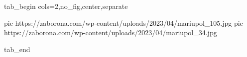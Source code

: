  
 
 
 
 


\ifcmt
  tab_begin cols=2,no_fig,center,separate

     pic https://zaborona.com/wp-content/uploads/2023/04/mariupol_105.jpg
		 pic https://zaborona.com/wp-content/uploads/2023/04/mariupol_34.jpg

  tab_end
\fi
